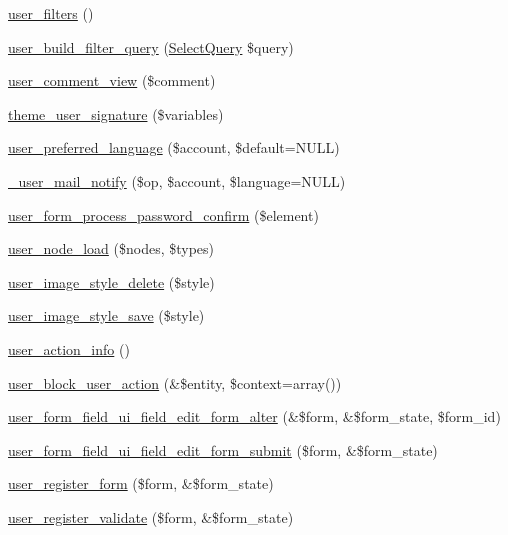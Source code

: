 \begin{DoxyCompactItemize}
\item 
\hyperlink{user_8module_a898a8a080e136ca20a94b1f3e3e04fd5}{user\_\-filters} ()
\item 
\hyperlink{user_8module_ae862ab5b636280ab3c4376eb2c00f049}{user\_\-build\_\-filter\_\-query} (\hyperlink{classSelectQuery}{SelectQuery} \$query)
\item 
\hyperlink{user_8module_a7f41acc702ef2d8c2161f79a709fae81}{user\_\-comment\_\-view} (\$comment)
\item 
\hyperlink{group__themeable_gabbd05d2d793e3f9ab99fee965bc3bbc2}{theme\_\-user\_\-signature} (\$variables)
\item 
\hyperlink{user_8module_a0122ed84b87c9b23dbd3be7ff563bc49}{user\_\-preferred\_\-language} (\$account, \$default=NULL)
\item 
\hyperlink{user_8module_a97bde917b48465820689f7d8dc437884}{\_\-user\_\-mail\_\-notify} (\$op, \$account, \$language=NULL)
\item 
\hyperlink{user_8module_ae2f4fd0c6769e59e37bf1a13e5f2a4cd}{user\_\-form\_\-process\_\-password\_\-confirm} (\$element)
\item 
\hyperlink{user_8module_adc38581bf39fce0ac244033595207933}{user\_\-node\_\-load} (\$nodes, \$types)
\item 
\hyperlink{user_8module_a8a773378fc4c0afa38865bbee2e88419}{user\_\-image\_\-style\_\-delete} (\$style)
\item 
\hyperlink{user_8module_ab3fec9538f68340d18a8c9b204e38f49}{user\_\-image\_\-style\_\-save} (\$style)
\item 
\hyperlink{user_8module_a804c5206067117643c1853f3e28bb208}{user\_\-action\_\-info} ()
\item 
\hyperlink{group__actions_gaaebd8bde2e44d7b334ba57e716fce110}{user\_\-block\_\-user\_\-action} (\&\$entity, \$context=array())
\item 
\hyperlink{user_8module_ab71e2dd6088fa2ef32b2e8a71e85fbbe}{user\_\-form\_\-field\_\-ui\_\-field\_\-edit\_\-form\_\-alter} (\&\$form, \&\$form\_\-state, \$form\_\-id)
\item 
\hyperlink{user_8module_a965286b291d94cac41246d7f350d4214}{user\_\-form\_\-field\_\-ui\_\-field\_\-edit\_\-form\_\-submit} (\$form, \&\$form\_\-state)
\item 
\hyperlink{group__forms_ga6dc04f116a25059727b3cf9e15205be8}{user\_\-register\_\-form} (\$form, \&\$form\_\-state)
\item 
\hyperlink{user_8module_a68ab440bc157b212a53dbe9a42a18107}{user\_\-register\_\-validate} (\$form, \&\$form\_\-state)

\end{DoxyCompactItemize}
